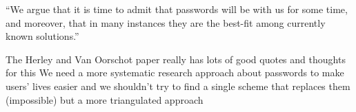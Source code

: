 ``We argue that it is time to admit that passwords will be with us for some time, and moreover, that in many instances they are the best-fit among currently known solutions.'' \cite{Herley2012PersistenceOfPasswords} 

The Herley and Van Oorschot paper really has lots of good quotes and thoughts for this
We need a more systematic research approach about passwords to make users' lives easier and we shouldn't try to find a single scheme that replaces them (impossible) but a more triangulated approach \cite{Herley2012PersistenceOfPasswords}


\cite{Kirlappos2012SecurityEducation,Loutfi2015PasswordsOtherSideOfTheFence,DeAngeli2005PictureThousandWords,Florencio2013WhereDoAllTheAttacksGo,Herley2008ProfitlessEndeavor,Sasse2015,Dittrich2009,Herley2009SoLongThanksExternalities,Vantaggiato2015WeStillNeedPasswords,Florencio2010WhereDoPoliciesComeFrom,Schrittwieser2013,Bonneau2015ImperfectAuthentication,Cyber2014,Florencio2007DoStrongWebPasswords,Sasse2005UsableSecurityPosition,Aebischer2017PicoInTheWild,Forget2007HelpingUsers,Herley2009IfWereSoSmart,Acar2016NotYourDeveloper,Sasse2016,Renaud2009VisualSnakeOil}

 